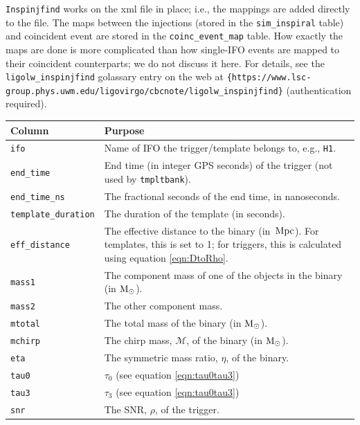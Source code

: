\verb|Inspinjfind| works on the xml file in place; i.e., the mappings are added directly to the file. The maps between the injections (stored in the \verb|sim_inspiral| table) and coincident event are stored in the \verb|coinc_event_map| table. How exactly the maps are done is more complicated than how single-\ac{IFO} events are mapped to their coincident counterparts; we do not discuss it here. For details, see the \verb|ligolw_inspinjfind| golassary entry on the web at \verb|{https://www.lsc-group.phys.uwm.edu/ligovirgo/cbcnote/ligolw_inspinjfind}| (authentication required).




\begin{table}[p]
\label{tab:sngl_inspiral}
\center
\begin{tabular}{l | p{10cm}}
Column      &   Purpose     \\
\hline \hline
\texttt{ifo}            &   Name of \ac{IFO} the trigger/template belongs to, e.g., \texttt{H1}. \\
\hline
\texttt{end\_time}      &   End time (in integer GPS seconds) of the trigger (not used by \texttt{tmpltbank}). \\
\hline
\texttt{end\_time\_ns}  & The fractional seconds of the end time, in nanoseconds. \\
\hline
\texttt{template\_duration} & The duration of the template (in seconds). \\
\hline
\texttt{eff\_distance}      & The effective distance to the binary (in $\,\mathrm{Mpc}$). For templates, this is set to 1; for triggers, this is calculated using equation \ref{eqn:DtoRho}. \\
\hline
\texttt{mass1}      & The component mass of one of the objects in the binary (in $\mathrm{M_\odot}$). \\
\hline
\texttt{mass2}      & The other component mass. \\
\hline
\texttt{mtotal}     & The total mass of the binary (in $\mathrm{M_\odot}$). \\
\hline
\texttt{mchirp}     & The chirp mass, $\mathcal{M}$, of the binary (in $\mathrm{M_\odot}$). \\
\hline
\texttt{eta}        & The symmetric mass ratio, $\eta$, of the binary. \\
\hline
\texttt{tau0}       & $\tau_0$ (see equation \ref{eqn:tau0tau3}) \\
\hline
\texttt{tau3}       & $\tau_3$ (see equation \ref{eqn:tau0tau3}) \\
\hline
\texttt{snr}        & The \ac{SNR}, $\rho$, of the trigger. \\

\end{tabular}
\end{table}
